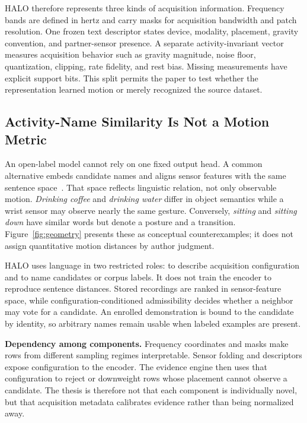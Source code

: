 HALO therefore represents three kinds of acquisition information. Frequency bands are defined in
hertz and carry masks for acquisition bandwidth and patch resolution. One frozen text descriptor
states device, modality, placement, gravity convention, and partner-sensor presence. A separate
activity-invariant vector measures acquisition behavior such as gravity magnitude, noise floor,
quantization, clipping, rate fidelity, and rest bias. Missing measurements have explicit support
bits. This split permits the paper to test whether the representation learned motion or merely
recognized the source dataset.

\subsection{Activity-Name Similarity Is Not a Motion Metric}
\label{sec:geometry}

An open-label model cannot rely on one fixed output head. A common alternative embeds candidate
names and aligns sensor features with the same sentence space~\cite{clip,lanhar,goat,unimts}. That
space reflects linguistic relation, not only observable motion. \emph{Drinking coffee} and
\emph{drinking water} differ in object semantics while a wrist sensor may observe nearly the same
gesture. Conversely, \emph{sitting} and \emph{sitting down} have similar words but denote a posture
and a transition. Figure~\ref{fig:geometry} presents these as conceptual counterexamples; it does
not assign quantitative motion distances by author judgment.



HALO uses language in two restricted roles: to describe acquisition configuration and to name
candidates or corpus labels. It does not train the encoder to reproduce sentence distances. Stored
recordings are ranked in sensor-feature space, while configuration-conditioned admissibility decides
whether a neighbor may vote for a candidate. An enrolled demonstration is bound to the candidate by
identity, so arbitrary names remain usable when labeled examples are present.

\textbf{Dependency among components.}
\label{sec:combination}%
Frequency coordinates and masks make rows from different sampling regimes interpretable. Sensor
folding and descriptors expose configuration to the encoder. The evidence engine then uses that
configuration to reject or downweight rows whose placement cannot observe a candidate. The thesis is
therefore not that each component is individually novel, but that acquisition metadata calibrates
evidence rather than being normalized away.
